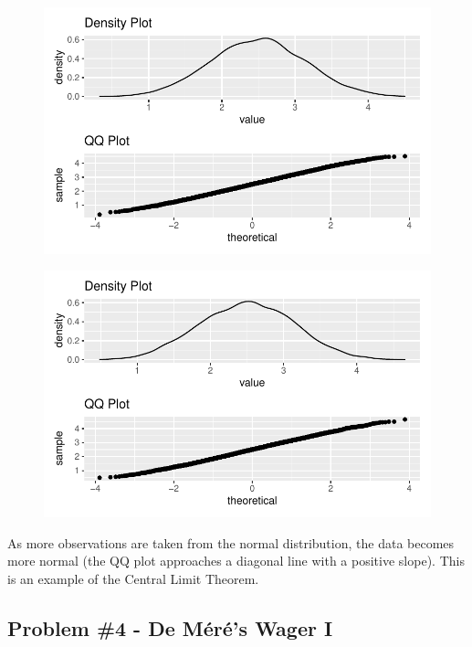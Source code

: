 \documentclass[
  letterpaper,
  DIV=11,
  numbers=noendperiod]{scrartcl}
\begin{document}
\begin{figure}[H]

{\centering \includegraphics{HW04_Gaughan_Melissa_files/figure-pdf/3c-3.pdf}

}

\end{figure}

\begin{figure}[H]

{\centering \includegraphics{HW04_Gaughan_Melissa_files/figure-pdf/3c-4.pdf}

}

\end{figure}

As more observations are taken from the normal distribution, the data
becomes more normal (the QQ plot approaches a diagonal line with a
positive slope). This is an example of the Central Limit Theorem.

\hypertarget{problem-4---de-muxe9ruxe9s-wager-i}{%
\subsection{Problem \#4 - De Méré's Wager
I}\label{problem-4---de-muxe9ruxe9s-wager-i}}
\end{document}

